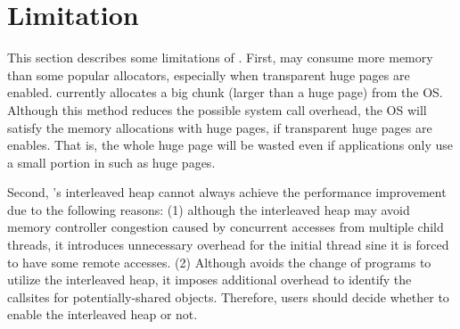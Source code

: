 \section{Limitation}
\label{sec:limit}

This section describes some limitations of \NM{}. First, \NM{} may consume more memory than some popular allocators, especially when transparent huge pages are enabled. \NM{} currently allocates a big chunk (larger than a huge page) from the OS. Although this method reduces the possible system call overhead, the OS will satisfy the memory allocations with huge pages, if transparent huge pages are enables. That is, the whole huge page will be wasted even if applications only use a small portion in such as huge pages. 

Second, \NM{}'s interleaved heap cannot always achieve the performance improvement due to the following reasons: (1) although the interleaved heap may avoid memory controller congestion caused by concurrent accesses from multiple child threads, it introduces unnecessary overhead for the initial thread sine it is forced to have some remote accesses. (2) Although \NM{} avoids the change of programs to utilize the interleaved heap, it imposes additional overhead to identify the callsites for potentially-shared objects. Therefore, users should decide whether to enable the interleaved heap or not. 

